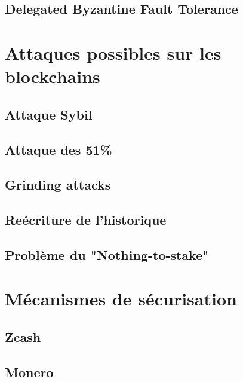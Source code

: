 \subsection{Delegated Byzantine Fault Tolerance}

\section{Attaques possibles sur les blockchains}

\subsection{Attaque Sybil}
\subsection{Attaque des 51\%}
\subsection{Grinding attacks}
\subsection{Reécriture de l'historique}
\subsection{Problème du "Nothing-to-stake"}

\section{Mécanismes de sécurisation}

\subsection{Zcash}
\subsection{Monero}